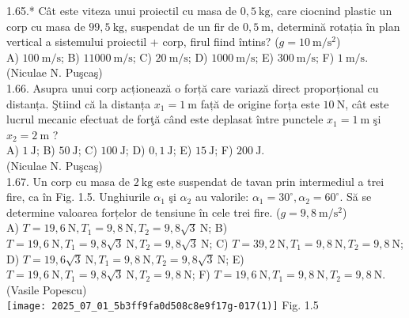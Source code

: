 1.65.* Cât este viteza unui proiectil cu masa de $0,5 \mathrm{~kg}$, care ciocnind plastic un corp cu masa de $99,5 \mathrm{~kg}$, suspendat de un fir de $0,5 \mathrm{~m}$, determină rotația în plan vertical a sistemului proiectil + corp, firul fiind întins? ($g=10 \mathrm{~m} / \mathrm{s}^{2}$)\\ A) $100 \mathrm{~m} / \mathrm{s}$; B) $11000 \mathrm{~m} / \mathrm{s}$; C) $20 \mathrm{~m} / \mathrm{s}$; D) $1000 \mathrm{~m} / \mathrm{s}$; E) $300 \mathrm{~m} / \mathrm{s}$; F) $1 \mathrm{~m} / \mathrm{s}$.\\ (Niculae N. Puşcaş)\\

1.66. Asupra unui corp acționează o forță care variază direct proporțional cu distanța. Ştiind că la distanța $x_{1}=1 \mathrm{~m}$ față de origine forța este $10 \mathrm{~N}$, cât este lucrul mecanic efectuat de forţă când este deplasat între punctele $x_{1}=1 \mathrm{~m}$ şi $x_{2}=2 \mathrm{~m}$ ?\\ A) $1 \mathrm{~J}$; B) $50 \mathrm{~J}$; C) $100 \mathrm{~J}$; D) $0,1 \mathrm{~J}$; E) $15 \mathrm{~J}$; F) $200 \mathrm{~J}$.\\ (Niculae N. Puşcaş)\\

1.67. Un corp cu masa de $2 \mathrm{~kg}$ este suspendat de tavan prin intermediul a trei fire, ca în Fig. 1.5. Unghiurile $\alpha_{1}$ şi $\alpha_{2}$ au valorile: $\alpha_{1}=30^{\circ}, \alpha_{2}=60^{\circ}$. Să se determine valoarea forțelor de tensiune în cele trei fire. ($g=9,8 \mathrm{~m} / \mathrm{s}^{2}$)\\ A) $T=19,6 \mathrm{~N}, T_{1}=9,8 \mathrm{~N}, T_{2}=9,8 \sqrt{3} \mathrm{~N}$; B) $T=19,6 \mathrm{~N}, T_{1}=9,8 \sqrt{3} \mathrm{~N}, T_{2}=9,8 \sqrt{3} \mathrm{~N}$; C) $T=39,2 \mathrm{~N}, T_{1}=9,8 \mathrm{~N}, T_{2}=9,8 \mathrm{~N}$; D) $T=19,6 \sqrt{3} \mathrm{~N}, T_{1}=9,8 \mathrm{~N}, T_{2}=9,8 \sqrt{3} \mathrm{~N}$; E) $T=19,6 \mathrm{~N}, T_{1}=9,8 \sqrt{3} \mathrm{~N}, T_{2}=9,8 \mathrm{~N}$; F) $T=19,6 \mathrm{~N}, T_{1}=9,8 \mathrm{~N}, T_{2}=9,8 \mathrm{~N}$.\\ (Vasile Popescu)\\ \texttt{[image: 2025\_07\_01\_5b3ff9fa0d508c8e9f17g-017(1)]} Fig. 1.5\\

